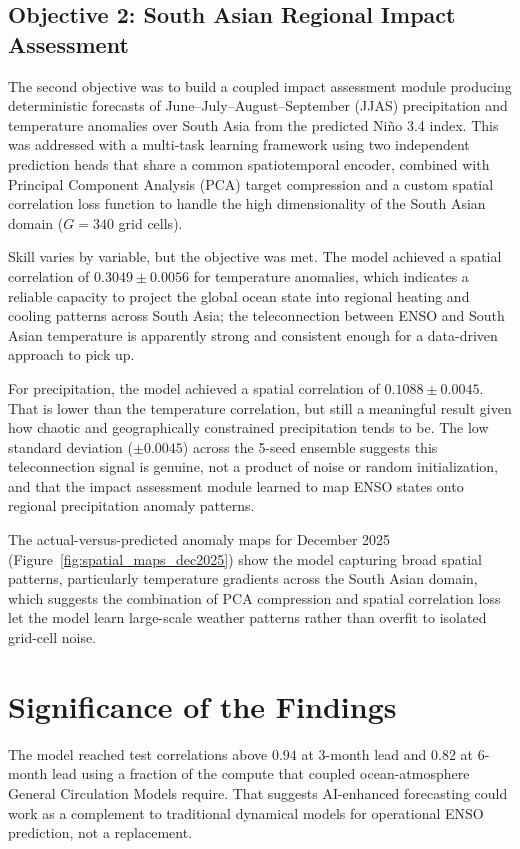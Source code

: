 \subsection{Objective 2: South Asian Regional Impact Assessment}
The second objective was to build a coupled impact assessment module producing deterministic forecasts of June--July--August--September (JJAS) precipitation and temperature anomalies over South Asia from the predicted Ni\~{n}o 3.4 index. This was addressed with a multi-task learning framework using two independent prediction heads that share a common spatiotemporal encoder, combined with Principal Component Analysis (PCA) target compression and a custom spatial correlation loss function to handle the high dimensionality of the South Asian domain ($G = 340$ grid cells).

Skill varies by variable, but the objective was met. The model achieved a spatial correlation of $0.3049 \pm 0.0056$ for temperature anomalies, which indicates a reliable capacity to project the global ocean state into regional heating and cooling patterns across South Asia; the teleconnection between ENSO and South Asian temperature is apparently strong and consistent enough for a data-driven approach to pick up.

For precipitation, the model achieved a spatial correlation of $0.1088 \pm 0.0045$. That is lower than the temperature correlation, but still a meaningful result given how chaotic and geographically constrained precipitation tends to be. The low standard deviation ($\pm 0.0045$) across the 5-seed ensemble suggests this teleconnection signal is genuine, not a product of noise or random initialization, and that the impact assessment module learned to map ENSO states onto regional precipitation anomaly patterns.

The actual-versus-predicted anomaly maps for December 2025 (Figure~\ref{fig:spatial_maps_dec2025}) show the model capturing broad spatial patterns, particularly temperature gradients across the South Asian domain, which suggests the combination of PCA compression and spatial correlation loss let the model learn large-scale weather patterns rather than overfit to isolated grid-cell noise.

\section{Significance of the Findings}

The model reached test correlations above $0.94$ at 3-month lead and $0.82$ at 6-month lead using a fraction of the compute that coupled ocean-atmosphere General Circulation Models require. That suggests AI-enhanced forecasting could work as a complement to traditional dynamical models for operational ENSO prediction, not a replacement.

